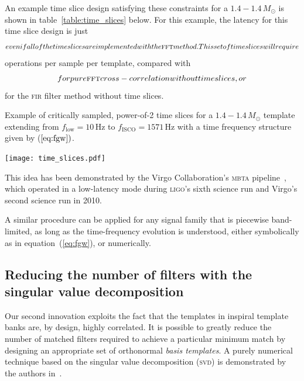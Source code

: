  An example time slice design satisfying these constraints for a $1.4 - 1.4 \, M_{\odot}$ is shown in table~\ref{table:time_slices} below.  For this example, the latency for this time slice design is just $$ even if all of the time slices are implemented with the \textsc{fft} method.  This set of time slices will require $$ operations per sample per template, compared with $$ for pure \textsc{fft} cross-correlation without time slices, or $$ for the \textsc{fir} filter method without time slices.

\begin{table}[!h]
\caption{Example of critically sampled, power-of-2 time slices for a $1.4 - 1.4 \, M_{\odot}$ template extending from $f_\mathrm{low} = 10 \, \mathrm{Hz}$ to $f_\mathrm{ISCO} = 1571\, \mathrm{Hz}$ with a time frequency structure given by ($\ref{eq:fgw})$.}
\label{table:time_slices}
\begin{minipage}[c]{0.5\textwidth}
\centering
\texttt{[image: time\_slices.pdf]}
\end{minipage}
\begin{minipage}[c]{0.3\textwidth}
\centering

\end{minipage}
\end{table}

  This idea has been demonstrated by the Virgo Collaboration's \textsc{mbta} pipeline~\cite{beauville2006,beauville2008}, which operated in a low-latency mode during \textsc{ligo}'s sixth science run and Virgo's second science run in 2010.

A similar procedure can be applied for any signal family that is piecewise band-limited, as long as the time-frequency evolution is understood, either symbolically as in equation~(\ref{eq:fgw}), or numerically.

\subsection{Reducing the number of filters with the singular value decomposition}

Our second innovation exploits the fact that the templates in inspiral template banks are, by design, highly correlated.  It is possible to greatly reduce the number of matched filters required to achieve a particular minimum match by designing an appropriate set of orthonormal {\em basis templates}.  A purely numerical technique based on the singular value decomposition (\textsc{svd}) is demonstrated by the authors in~\cite{Cannon:2010p10398}.

